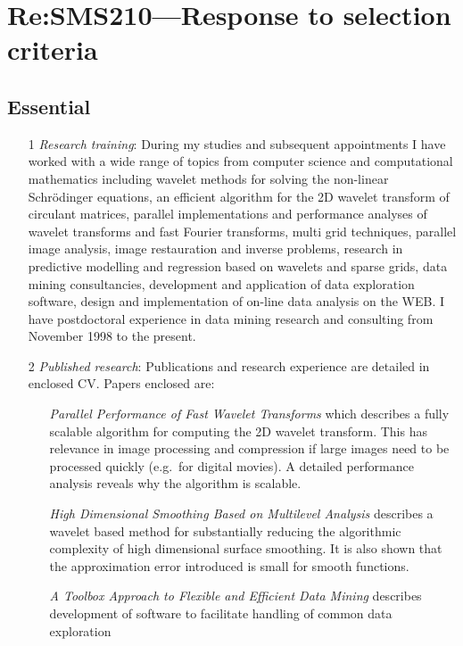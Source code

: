 \documentclass[12pt,a4paper]{article}
\begin{document}
\section*{Re:SMS210---Response to selection criteria}

\subsection*{Essential}
\begin{itemize}
  \item[1] \textit{Research training}:
  During my studies and subsequent appointments I have worked with
  a wide range of topics from computer science and computational mathematics
  including wavelet methods for solving the 
  non-linear Schr{\"o}dinger equations, an efficient algorithm for the 
  2D wavelet transform of circulant matrices, 
  parallel implementations and performance analyses of wavelet
  transforms and fast Fourier transforms, multi grid techniques, 
  parallel image analysis, image restauration and inverse problems, 
  research in predictive modelling 
  and regression based on wavelets and sparse grids, 
  data mining consultancies, development and application of 
  data exploration software, design and implementation of on-line data 
  analysis on the WEB. 
  I have postdoctoral experience in data mining research and consulting
  from November 1998 to the present.
  \item[2] \textit{Published research}: 
  Publications and research experience are detailed in enclosed CV.  
  Papers enclosed are: 
  \begin{itemize} 
  \item[] \textit{Parallel Performance of Fast Wavelet Transforms} 
  which describes 
  a fully scalable algorithm for computing the 2D wavelet transform. 
  This has relevance in image processing and compression if large 
  images need to be processed quickly (e.g.\ for digital movies). A detailed
  performance analysis reveals why the algorithm is scalable.
  \item[] \textit{High Dimensional Smoothing Based on Multilevel Analysis} 
  describes
  a wavelet based method for substantially reducing the algorithmic 
  complexity of high dimensional surface smoothing. It is also shown 
  that the approximation error introduced is small for smooth functions.  
  \item[] \textit{A Toolbox Approach to Flexible and Efficient Data Mining} 
  describes 
  development of software to facilitate handling of common data exploration 

\end{itemize}
\end{itemize}
\end{document}
